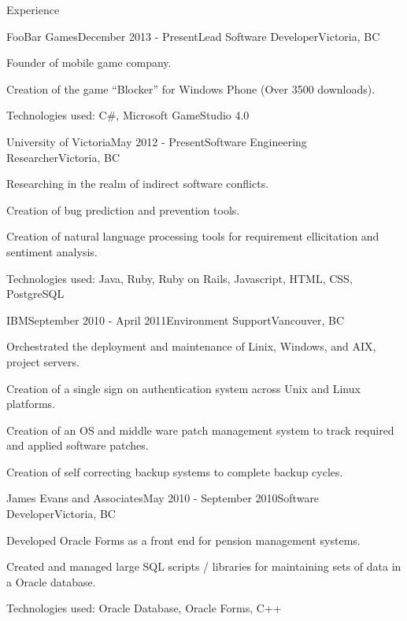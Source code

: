 \documentclass{resume} %
\begin{document}
\begin{rSection}{Experience}


\begin{rSubsection}{FooBar Games}{December 2013 - Present}{Lead Software Developer}{Victoria, BC}
\item Founder of mobile game company.
\item Creation of the game ``Blocker'' for Windows Phone (Over 3500 downloads).
\item Technologies used: C\#, Microsoft GameStudio 4.0
\end{rSubsection}

\begin{rSubsection}{University of Victoria}{May 2012 - Present}{Software Engineering Researcher}{Victoria, BC}
\item Researching in the realm of indirect software conflicts.
\item Creation of bug prediction and prevention tools.
\item Creation of natural language processing tools for requirement ellicitation and sentiment analysis.
\item Technologies used: Java, Ruby, Ruby on Rails, Javascript, HTML, CSS, PostgreSQL
\end{rSubsection}


\begin{rSubsection}{IBM}{September 2010 - April 2011}{Environment Support}{Vancouver, BC}
\item Orchestrated the deployment and maintenance of Linix, Windows, and AIX, project servers.
\item Creation of a single sign on authentication system across Unix and Linux platforms.
\item Creation of an OS and middle ware patch management system to track required and applied software patches.
\item Creation of self correcting backup systems to complete backup cycles.
\end{rSubsection}


\begin{rSubsection}{James Evans and Associates}{May 2010 - September 2010}{Software Developer}{Victoria, BC}
\item Developed Oracle Forms as a front end for pension management systems.
\item Created and managed large SQL scripts / libraries for maintaining sets of data in a Oracle database.
\item Technologies used: Oracle Database, Oracle Forms, C++ 
\end{rSubsection}

\end{rSection}
\end{document}
